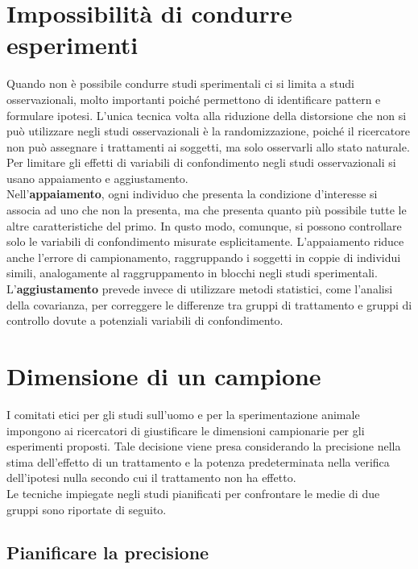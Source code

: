 \documentclass[10pt, draft]{book}
\begin{document}
\section{Impossibilità di condurre esperimenti}

Quando non è possibile condurre studi sperimentali ci si limita a studi osservazionali, molto importanti poiché permettono di identificare pattern e formulare ipotesi. L'unica tecnica volta alla riduzione della distorsione che non si può utilizzare negli studi osservazionali è la randomizzazione, poiché il ricercatore non può assegnare i trattamenti ai soggetti, ma solo osservarli allo stato naturale.\\
Per limitare gli effetti di variabili di confondimento negli studi osservazionali si usano appaiamento e aggiustamento.\\
Nell'\textbf{appaiamento}, ogni individuo che presenta la condizione d'interesse si associa ad uno che non la presenta, ma che presenta quanto più possibile tutte le altre caratteristiche del primo. In qusto modo, comunque, si possono controllare solo le variabili di confondimento misurate esplicitamente. L'appaiamento riduce anche l'errore di campionamento, raggruppando i soggetti in coppie di individui simili, analogamente al raggruppamento in blocchi negli studi sperimentali.\\
L'\textbf{aggiustamento} prevede invece di utilizzare metodi statistici, come l'analisi della covarianza, per correggere le differenze tra gruppi di trattamento e gruppi di controllo dovute a potenziali variabili di confondimento.

\section{Dimensione di un campione}

I comitati etici per gli studi sull'uomo e per la sperimentazione animale impongono ai ricercatori di giustificare le dimensioni campionarie per gli esperimenti proposti. Tale decisione viene presa considerando la precisione nella stima dell'effetto di un trattamento e la potenza predeterminata nella verifica dell'ipotesi nulla secondo cui il trattamento non ha effetto.\\
Le tecniche impiegate negli studi pianificati per confrontare le medie di due gruppi sono riportate di seguito.

\subsection{Pianificare la precisione}
\end{document}
